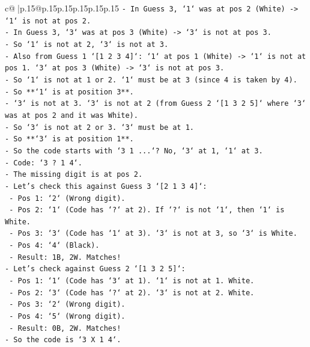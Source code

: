 \documentclass{article}
\begin{document}
{\begin{supertabular}{c@{$\;$}|p{.15\linewidth}@{}p{.15\linewidth}p{.15\linewidth}p{.15\linewidth}p{.15\linewidth}p{.15\linewidth}}
{{{\texttt{{-} In Guess 3, `1` was at pos 2 (White) {-}> `1` is not at pos 2.} \\
\texttt{{-} In Guess 3, `3` was at pos 3 (White) {-}> `3` is not at pos 3.} \\
\texttt{{-} So `1` is not at 2, `3` is not at 3.} \\
\texttt{{-} Also from Guess 1 `{[}1 2 3 4{]}`: `1` at pos 1 (White) {-}> `1` is not at pos 1. `3` at pos 3 (White) {-}> `3` is not at pos 3.} \\
\texttt{{-} So `1` is not at 1 or 2. `1` must be at 3 (since 4 is taken by 4).} \\
\texttt{{-} So **`1` is at position 3**.} \\
\texttt{{-} `3` is not at 3. `3` is not at 2 (from Guess 2 `{[}1 3 2 5{]}` where `3` was at pos 2 and it was White).} \\
\texttt{{-} So `3` is not at 2 or 3. `3` must be at 1.} \\
\texttt{{-} So **`3` is at position 1**.} \\
\texttt{{-} So the code starts with `3 1 ...`? No, `3` at 1, `1` at 3.} \\
\texttt{{-} Code: `3 ? 1 4`.} \\
\texttt{{-} The missing digit is at pos 2.} \\
\texttt{{-} Let's check this against Guess 3 `{[}2 1 3 4{]}`:} \\
\texttt{  {-} Pos 1: `2` (Wrong digit).} \\
\texttt{  {-} Pos 2: `1` (Code has `?` at 2). If `?` is not `1`, then `1` is White.} \\
\texttt{  {-} Pos 3: `3` (Code has `1` at 3). `3` is not at 3, so `3` is White.} \\
\texttt{  {-} Pos 4: `4` (Black).} \\
\texttt{  {-} Result: 1B, 2W. Matches!} \\
\texttt{{-} Let's check against Guess 2 `{[}1 3 2 5{]}`:} \\
\texttt{  {-} Pos 1: `1` (Code has `3` at 1). `1` is not at 1. White.} \\
\texttt{  {-} Pos 2: `3` (Code has `?` at 2). `3` is not at 2. White.} \\
\texttt{  {-} Pos 3: `2` (Wrong digit).} \\
\texttt{  {-} Pos 4: `5` (Wrong digit).} \\
\texttt{  {-} Result: 0B, 2W. Matches!} \\
\texttt{{-} So the code is `3 X 1 4`.} \\
}}}
\end{supertabular}}
\end{document}
